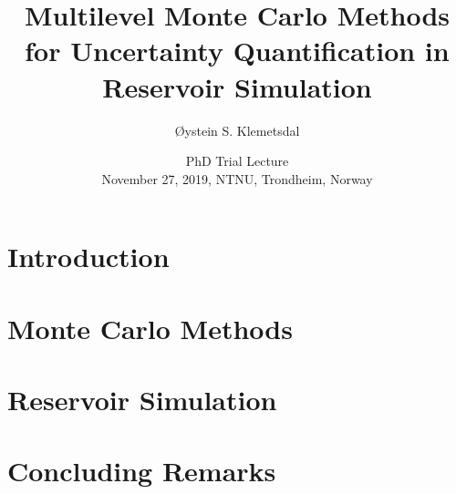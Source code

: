 \documentclass[aspectratio=169]{beamer}
\title{Multilevel Monte Carlo Methods for Uncertainty Quantification in Reservoir Simulation}
\author[Ø.S. Klemetsdal]{Øystein S. Klemetsdal}%
\date[27/11/19]{PhD Trial Lecture\\November 27, 2019, NTNU, Trondheim, Norway}%
\begin{document}
\maketitle

\nocite{*}

\section{Introduction}


\section{Monte Carlo Methods}



\section{Reservoir Simulation}




\section{Concluding Remarks}

\end{document}
